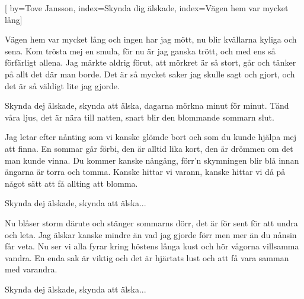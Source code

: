 


[ 	%
	by={Tove Jansson},
	index={Skynda dig älskade},
	index={Vägen hem var mycket lång}]		%
	
\beginverse*		%
Vägen hem var mycket lång och ingen har jag mött,
nu blir kvällarna kyliga och sena.
Kom trösta mej en smula, för nu är jag ganska trött,
och med ens så förfärligt allena.
Jag märkte aldrig förut, att mörkret är så stort,
går och tänker på allt det där man borde.
Det är så mycket saker jag skulle sagt och gjort,
och det är så väldigt lite jag gjorde.
\endverse			%

\beginchorus
Skynda dej älskade, skynda att älska,
dagarna mörkna minut för minut.
Tänd våra ljus, det är nära till natten,
snart blir den blommande sommarn slut.
\endchorus

\beginverse*		%
Jag letar efter nånting som vi kanske glömde bort
och som du kunde hjälpa mej att finna.
En sommar går förbi, den är alltid lika kort,
den är drömmen om det man kunde vinna.
Du kommer kanske nångång, förr'n skymningen blir blå
innan ängarna är torra och tomma.
Kanske hittar vi varann, kanske hittar vi då på
något sätt att få allting att blomma.
\endverse			%

\beginchorus
Skynda dej älskade, skynda att älska...
\endchorus

\newpage
\beginverse*		%
Nu blåser storm därute och stänger sommarns dörr,
det är för sent för att undra och leta.
Jag älskar kanske mindre än vad jag gjorde förr
men mer än du nånsin får veta.
Nu ser vi alla fyrar kring höstens långa kust
och hör vågorna villsamma vandra.
En enda sak är viktig och det är hjärtats lust
och att få vara samman med varandra.
\endverse			%

\beginchorus
Skynda dej älskade, skynda att älska...
\endchorus
\endsong			%

